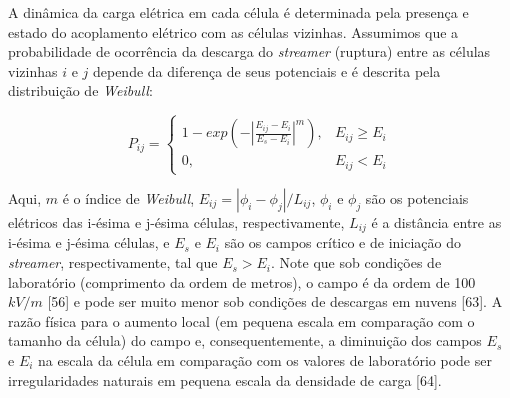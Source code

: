 \documentclass[a4paper, 12pt, onecolumn,singlespacing]{article}
\begin{document}
	A dinâmica da carga elétrica em cada célula é determinada pela presença e estado do acoplamento elétrico com as células vizinhas. Assumimos que a probabilidade de ocorrência da descarga do \textit{streamer} (ruptura) entre as células vizinhas $i$ e $j$ depende da diferença de seus potenciais e é descrita pela distribuição de \textit{Weibull}:
	
	\begin{equation}
		P_{ij} = \begin{cases}
					1 - exp \left( -\left| \frac{E_{ij} - E_i}{E_s - E_i} \right|^m\right ), &  E_{ij} \geq E_i \\ 
					0, & E_{ij} < E_i 
				 \end{cases}
	\end{equation}
	
	Aqui, $m$ é o índice de \textit{Weibull}, $E_{ij} = |\phi_i - \phi_j |/L_{ij}$, $\phi_i$ e $\phi_j$ são os potenciais elétricos das i-ésima e j-ésima células, respectivamente, $L_{ij}$ é a distância entre as i-ésima e j-ésima células, e $E_s$ e $E_i$ são os campos crítico e de iniciação do \textit{streamer}, respectivamente, tal que $E_s > E_i$. Note que sob condições de laboratório (comprimento da ordem de metros), o campo é da ordem de 100 $kV/m$ [56] e pode ser muito menor sob condições de descargas em nuvens [63]. A razão física para o aumento local (em pequena escala em comparação com o tamanho da célula) do campo e, consequentemente, a diminuição dos campos $E_s$ e $E_i$ na escala da célula em comparação com os valores de laboratório pode ser irregularidades naturais em pequena escala da densidade de carga [64].
\end{document}
